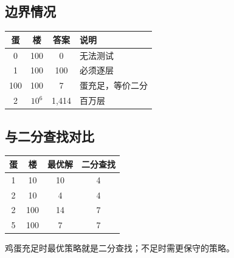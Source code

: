 \documentclass[12pt,a4paper]{article}
\begin{document}
\subsection{边界情况}

\begin{table}[H]
\centering
\begin{tabular}{@{}cccl@{}}
\toprule
\textbf{蛋} & \textbf{楼} & \textbf{答案} & \textbf{说明} \\
\midrule
0 & 100 & 0 & 无法测试 \\
1 & 100 & 100 & 必须逐层 \\
100 & 100 & 7 & 蛋充足，等价二分 \\
2 & $10^6$ & 1,414 & 百万层 \\
\bottomrule
\end{tabular}
\end{table}

\subsection{与二分查找对比}

\begin{table}[H]
\centering
\begin{tabular}{@{}cccc@{}}
\toprule
\textbf{蛋} & \textbf{楼} & \textbf{最优解} & \textbf{二分查找} \\
\midrule
1 & 10 & 10 & 4 \\
2 & 10 & 4 & 4 \\
2 & 100 & 14 & 7 \\
5 & 100 & 7 & 7 \\
\bottomrule
\end{tabular}
\end{table}

鸡蛋充足时最优策略就是二分查找；不足时需更保守的策略。
\end{document}
